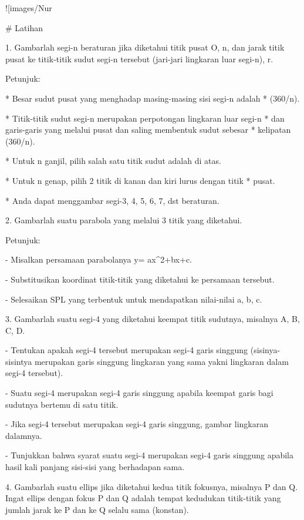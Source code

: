 \documentclass{article}
\begin{document}
![images/Nur%

# Latihan

1. Gambarlah segi-n beraturan jika diketahui titik pusat O, n, dan
jarak titik pusat ke titik-titik sudut segi-n tersebut (jari-jari
lingkaran luar segi-n), r.


Petunjuk:


* 
Besar sudut pusat yang menghadap masing-masing sisi segi-n adalah
* (360/n).

* 
Titik-titik sudut segi-n merupakan perpotongan lingkaran luar segi-n
* dan garis-garis yang melalui pusat dan saling membentuk sudut sebesar
* kelipatan (360/n).

* 
Untuk n ganjil, pilih salah satu titik sudut adalah di atas.

* 
Untuk n genap, pilih 2 titik di kanan dan kiri lurus dengan titik
* pusat.

* 
Anda dapat menggambar segi-3, 4, 5, 6, 7, dst beraturan.


2. Gambarlah suatu parabola yang melalui 3 titik yang diketahui.


Petunjuk:


- Misalkan persamaan parabolanya y= ax^2+bx+c.


- Substitusikan koordinat titik-titik yang diketahui ke persamaan
tersebut.


- Selesaikan SPL yang terbentuk untuk mendapatkan nilai-nilai a, b, c.


3. Gambarlah suatu segi-4 yang diketahui keempat titik sudutnya,
misalnya A, B, C, D.


   - Tentukan apakah segi-4 tersebut merupakan segi-4 garis singgung
(sisinya-sisintya merupakan garis singgung lingkaran yang sama yakni
lingkaran dalam segi-4 tersebut).


   - Suatu segi-4 merupakan segi-4 garis singgung apabila keempat
garis bagi sudutnya bertemu di satu titik.


   - Jika segi-4 tersebut merupakan segi-4 garis singgung, gambar
lingkaran dalamnya.


   - Tunjukkan bahwa syarat suatu segi-4 merupakan segi-4 garis
singgung apabila hasil kali panjang sisi-sisi yang berhadapan sama.


4. Gambarlah suatu ellips jika diketahui kedua titik fokusnya,
misalnya P dan Q. Ingat ellips dengan fokus P dan Q adalah tempat
kedudukan titik-titik yang jumlah jarak ke P dan ke Q selalu sama
(konstan).
\end{document}
